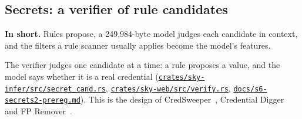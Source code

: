 \documentclass[10pt]{article}
\begin{document}
\subsection{Secrets: a verifier of rule candidates}\label{sec:6.3}

\textbf{In short.} Rules propose, a 249,984-byte model judges each candidate in context, and the filters a rule scanner usually applies become the model's features.

The verifier judges one candidate at a time: a rule proposes a value, and the model says whether it is a real credential (\href{https://github.com/maxgfr/skycmd/blob/main/crates/sky-infer/src/secret_cand.rs}{\texttt{crates/\allowbreak{}sky-infer/\allowbreak{}src/\allowbreak{}secret\_\allowbreak{}cand.rs}}, \href{https://github.com/maxgfr/skycmd/blob/main/crates/sky-web/src/verify.rs}{\texttt{crates/\allowbreak{}sky-web/\allowbreak{}src/\allowbreak{}verify.rs}}, \href{https://github.com/maxgfr/skycmd/blob/main/docs/s6-secrets2-prereg.md}{\texttt{docs/\allowbreak{}s6-secrets2-prereg.md}}). This is the design of CredSweeper~\cite{credsweeper}, Credential Digger~\cite{digger} and FP Remover~\cite{fpremover}.
\end{document}
